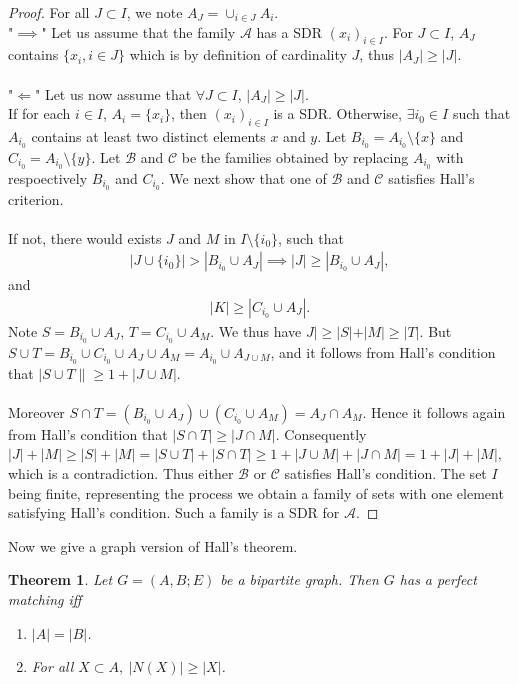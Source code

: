 \documentclass[12pt,a4paper]{article}
\newtheorem{thm}{Theorem}[section]
\theoremstyle{definition}
\begin{document}
\begin{proof} For all $J \subset I$, we note $A_J= \cup_{i \in J} A_i$. \\
"$\implies$" Let us assume that the family $\mathcal{A}$ has a SDR $(x_i)_{i \in I}$. For $J \subset I$, $A_J$ contains $\{x_i, i \in J\}$ which is by definition  of cardinality $J$, thus $|A_J| \geq |J|$. 
\\\\
"$\Longleftarrow$" Let us now assume that $\forall J \subset I$, $|A_J| \geq |J|$.  \\
If for each $i \in I$, $A_i = \{x_i\}$, then $(x_i)_{i \in I}$ is a SDR. Otherwise, $\exists i_0 \in I$ such that $A_{i_0}$ contains at least two distinct elements $x$ and $y$. Let $B_{i_0} = A_{i_0} \setminus \{x\}$ and $C_{i_0} = A_{i_0} \setminus \{y\}$. Let $\mathcal{B}$ and $\mathcal{C}$ be the families obtained by replacing $A_{i_0}$ with respoectively $B_{i_0}$ and $C_{i_0}$. We next show that one of $\mathcal{B}$ and $\mathcal{C}$ satisfies Hall's criterion. 
\\\\
If not, there would exists $J$ and $M$ in $I \setminus \{i_0\}$, such that 
\begin{align*}
|J \cup \{i_0\} | > |B_{i_0} \cup A_J| \implies |J| \geq |B_{i_0} \cup A_J|,
\end{align*}
and
\begin{align*}
|K| \geq |C_{i_0} \cup A_J|.
\end{align*}
Note $S= B_{i_0} \cup A_J$, $T= C_{i_0} \cup A_M$. We thus have $J|  \geq |S| + |M| \geq |T|$. But $S \cup T= B_{i_0} \cup C_{i_0} \cup A_J \cup A_M = A_{i_0} \cup A_{J \cup M}$, and it follows from Hall's condition that $|S \cup T \| \geq 1 + |J \cup M|$.  
\\\\
Moreover $S\cap T = (B_{i_0} \cup A_J) \cup (C_{i_0} \cup A_M) = A_J \cap A_M$. Hence it follows again from Hall's condition that $|S \cap T| \geq  |J \cap M|$. Consequently $|J| + |M| \geq |S| + |M| = |S \cup T| + |S \cap T| \geq 1 + |J \cup M| + |J \cap M| = 1 + |J| + |M|,$ which is a contradiction. Thus either $\mathcal{B}$ or $\mathcal{C}$ satisfies Hall's condition. The set $I$ being finite, representing the process we obtain a family of sets with one element satisfying Hall's condition. Such a family is a SDR for $\mathcal{A}$. 
\end{proof}
Now we give a graph version of Hall's theorem.
\begin{thm} Let $G=(A,B;E)$ be a bipartite graph. Then $G$ has a perfect matching iff 
\begin{enumerate}
\item $|A|=|B|$.
\item For all $X \subset A, \ |N(X)| \geq |X|$. 
\end{enumerate}
\end{thm}
\end{document}
